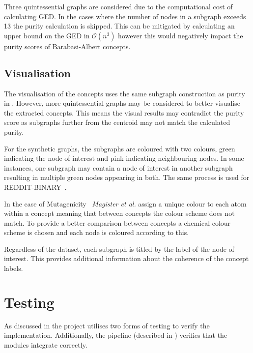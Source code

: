 Three quintessential graphs are considered due to the computational cost of calculating GED.
In the cases where the number of nodes in a subgraph exceeds 13 the purity calculation is skipped.
This can be mitigated by calculating an upper bound on the GED in $\mathcal{O}(n^3)$ however this would negatively impact the purity scores of Barabasi-Albert concepts.

\subsection{Visualisation}
\label{sec:vis}
The visualisation of the concepts uses the same subgraph construction as purity in .
However, more quintessential graphs may be considered to better visualise the extracted concepts.
This means the visual results may contradict the purity score as subgraphs further from the centroid may not match the calculated purity.

For the synthetic graphs, the subgraphs are coloured with two colours, green indicating the node of interest and pink indicating neighbouring nodes.
In some instances, one subgraph may contain a node of interest in another subgraph resulting in multiple green nodes appearing in both.
The same process is used for REDDIT-BINARY~\cite{Morris+2020}.

In the case of Mutagenicity~\cite{Morris+2020} \textit{Magister et al.}\cite{magister2021gcexplainer} assign a unique colour to each atom within a concept meaning that between concepts the colour scheme does not match.
To provide a better comparison between concepts a chemical colour scheme is chosen and each node is coloured according to this.

Regardless of the dataset, each subgraph is titled by the label of the node of interest.
This provides additional information about the coherence of the concept labels.

\section{Testing}
\label{sec:testing-imp}
As discussed in  the project utilises two forms of testing to verify the implementation.
Additionally, the pipeline (described in ) verifies that the modules integrate correctly.


